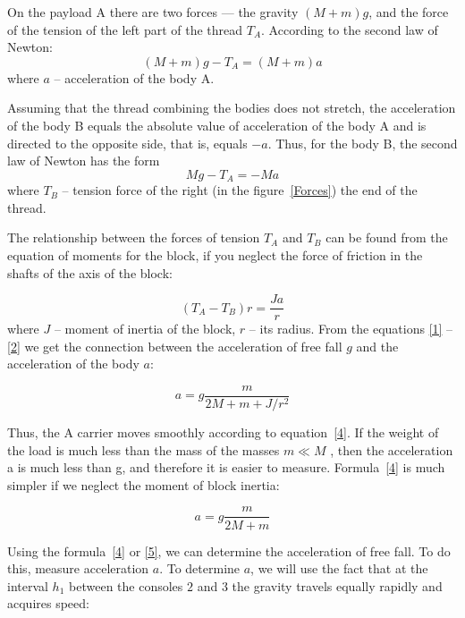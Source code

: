 \documentclass{LabWorkEng}
\begin{document}
On the payload A there are two forces --- the gravity $(M + m)g$, and the force of the tension of the left part of the thread $T_A$. According to the second law of Newton:
\begin{equation}\label{1}
	\left( {M + m} \right)g - {T_A} = \left( {M + m} \right)a
\end{equation}
where $a$ -- acceleration of the body A.

Assuming that the thread combining the bodies does not stretch, the acceleration of the body B equals the absolute value of acceleration of the body A and is directed to the opposite side, that is, equals $-a$. Thus, for the body B, the second law of Newton has the form
\begin{equation}\label{2}
	Mg - T_A =  - Ma
\end{equation}
where $T_B$ -- tension force of the right (in the figure~\ref{Forces}) the end of the thread.

The relationship between the forces of tension $T_A$ and $T_B$ can be found from the equation of moments for the block, if you neglect the force of friction in the shafts of the axis of the block:

\begin{equation}\label{3}
	\left( {{T_A} - {T_B}} \right)r = \frac{{Ja}}{r}
\end{equation}
where $J$ -- moment of inertia of the block, $r$ -- its radius. From the equations \eqref{1} -- \eqref{2} we get the connection between the acceleration of free fall $g$ and the acceleration of the body $a$:


\begin{equation}\label{4}
	a = g\frac{m}{{2M + m + J/{r^2}}}
\end{equation}

Thus, the A carrier moves smoothly according to equation~\eqref{4}. If the weight of the load is much less than the mass of the masses $m \ll  M$ , then the acceleration a is much less than g, and therefore it is easier to measure. Formula~\eqref{4} is much simpler if we neglect the moment of block inertia:

\begin{equation}\label{5}
	a = g\frac{m}{{2M + m}}
\end{equation}


Using the formula~\eqref{4} or \eqref{5}, we can determine the acceleration of free fall. To do this, measure acceleration $a$. To determine $a$, we will use the fact that at the interval $h_1$ between the consoles $2$ and $3$ the gravity travels equally rapidly and acquires speed:
\end{document}
